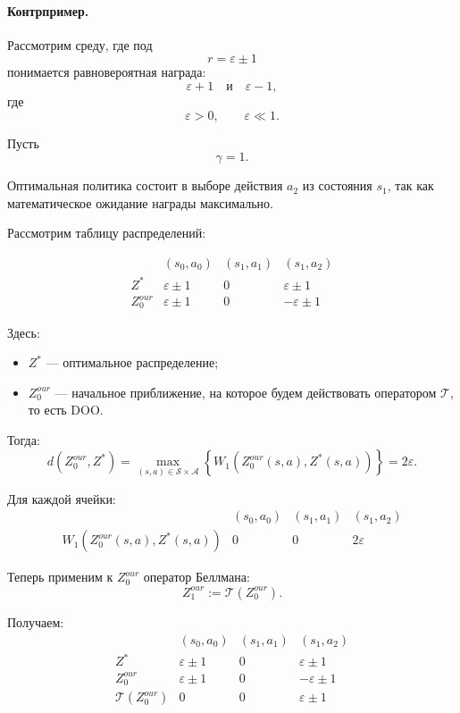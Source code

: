\documentclass[12pt,a4paper]{article}
\begin{document}
\paragraph{Контрпример.}

Рассмотрим среду, где под
\[
r=\varepsilon \pm 1
\]
понимается равновероятная награда:
\[
\varepsilon+1
\quad
\text{и}
\quad
\varepsilon-1,
\]
где
\[
\varepsilon>0,
\qquad
\varepsilon \ll 1.
\]

Пусть
\[
\gamma=1.
\]

Оптимальная политика состоит в выборе действия $a_2$ из состояния $s_1$, так как математическое ожидание награды максимально.

Рассмотрим таблицу распределений:

\[
\begin{array}{c|c|c|c}
 & (s_0,a_0) & (s_1,a_1) & (s_1,a_2) \\
\hline
Z^\ast & \varepsilon \pm 1 & 0 & \varepsilon \pm 1 \\
Z^{our}_0 & \varepsilon \pm 1 & 0 & -\varepsilon \pm 1
\end{array}
\]

Здесь:
\begin{itemize}
    \item $Z^\ast$ --- оптимальное распределение;
    \item $Z^{our}_0$ --- начальное приближение, на которое будем действовать оператором $\mathcal T$, то есть DOO.
\end{itemize}

Тогда:
\[
d(Z^{our}_0,Z^\ast)
=
\max_{(s,a)\in \mathcal S\times \mathcal A}
\left\{
W_1
\left(
Z^{our}_0(s,a),
Z^\ast(s,a)
\right)
\right\}
=
2\varepsilon.
\]

Для каждой ячейки:
\[
\begin{array}{c|c|c|c}
 & (s_0,a_0) & (s_1,a_1) & (s_1,a_2) \\
\hline
W_1(Z^{our}_0(s,a),Z^\ast(s,a)) & 0 & 0 & 2\varepsilon
\end{array}
\]

Теперь применим к $Z^{our}_0$ оператор Беллмана:
\[
Z^{our}_1
:=
\mathcal T(Z^{our}_0).
\]

Получаем:
\[
\begin{array}{c|c|c|c}
 & (s_0,a_0) & (s_1,a_1) & (s_1,a_2) \\
\hline
Z^\ast & \varepsilon \pm 1 & 0 & \varepsilon \pm 1 \\
Z^{our}_0 & \varepsilon \pm 1 & 0 & -\varepsilon \pm 1 \\
\mathcal T(Z^{our}_0) & 0 & 0 & \varepsilon \pm 1
\end{array}
\]
\end{document}
